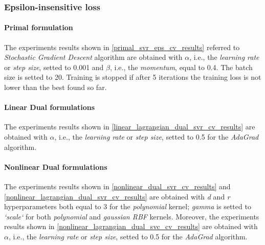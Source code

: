\subsubsection{Epsilon-insensitive loss}

\paragraph{Primal formulation}

The experiments results shown in \ref{primal_svr_eps_cv_results} referred to \emph{Stochastic Gradient Descent} algorithm are obtained with $\alpha$, i.e., the \emph{learning rate} or \emph{step size}, setted to 0.001 and $\beta$, i.e., the \emph{momentum}, equal to 0.4. The batch size is setted to 20. Training is stopped if after 5 iterations the training loss is not lower than the best found so far.



\paragraph{Linear Dual formulations}

The experiments results shown in \ref{linear_lagrangian_dual_svr_cv_results} are obtained with $\alpha$, i.e., the \emph{learning rate} or \emph{step size}, setted to 0.5 for the \emph{AdaGrad} algorithm.





\paragraph{Nonlinear Dual formulations}

The experiments results shown in \ref{nonlinear_dual_svr_cv_results} and \ref{nonlinear_lagrangian_dual_svr_cv_results} are obtained with \emph{d} and \emph{r} hyperparameters both equal to 3 for the \emph{polynomial} kernel; \emph{gamma} is setted to \emph{`scale`} for both \emph{polynomial} and \emph{gaussian RBF} kernels. Moreover, the experiments results shown in \ref{nonlinear_lagrangian_dual_svc_cv_results} are obtained with $\alpha$, i.e., the \emph{learning rate} or \emph{step size}, setted to 0.5 for the \emph{AdaGrad} algorithm.






